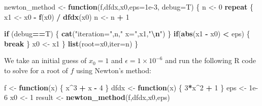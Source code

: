 \documentclass[
]{article}
\newenvironment{Shaded}{\begin{snugshade}}{\end{snugshade}}
\newcommand{\AttributeTok}[1]{\textcolor[rgb]{0.13,0.29,0.53}{#1}}
\newcommand{\ControlFlowTok}[1]{\textcolor[rgb]{0.13,0.29,0.53}{\textbf{#1}}}
\newcommand{\DecValTok}[1]{\textcolor[rgb]{0.00,0.00,0.81}{#1}}
\newcommand{\FloatTok}[1]{\textcolor[rgb]{0.00,0.00,0.81}{#1}}
\newcommand{\FunctionTok}[1]{\textcolor[rgb]{0.13,0.29,0.53}{\textbf{#1}}}
\newcommand{\NormalTok}[1]{#1}
\newcommand{\OtherTok}[1]{\textcolor[rgb]{0.56,0.35,0.01}{#1}}
\newcommand{\SpecialCharTok}[1]{\textcolor[rgb]{0.81,0.36,0.00}{\textbf{#1}}}
\newcommand{\StringTok}[1]{\textcolor[rgb]{0.31,0.60,0.02}{#1}}
\begin{document}
\begin{Shaded}
\begin{Highlighting}[]
\NormalTok{newton\_method }\OtherTok{\textless{}{-}} \ControlFlowTok{function}\NormalTok{(f,dfdx,x0,}\AttributeTok{eps=}\FloatTok{1e{-}3}\NormalTok{, }\AttributeTok{debug=}\NormalTok{T)}
\NormalTok{\{}
\NormalTok{  n }\OtherTok{\textless{}{-}} \DecValTok{0}
  \ControlFlowTok{repeat}
\NormalTok{  \{}
\NormalTok{    x1 }\OtherTok{\textless{}{-}}\NormalTok{ x0 }\SpecialCharTok{{-}} \FunctionTok{f}\NormalTok{(x0) }\SpecialCharTok{/} \FunctionTok{dfdx}\NormalTok{(x0)}
\NormalTok{    n }\OtherTok{\textless{}{-}}\NormalTok{ n }\SpecialCharTok{+} \DecValTok{1}
   
    \ControlFlowTok{if}\NormalTok{ (debug}\SpecialCharTok{==}\NormalTok{T) \{ }\FunctionTok{cat}\NormalTok{(}\StringTok{"iteration="}\NormalTok{,n,}\StringTok{" x="}\NormalTok{,x1,}\StringTok{"}\SpecialCharTok{\textbackslash{}n}\StringTok{"}\NormalTok{) \}}
    \ControlFlowTok{if}\NormalTok{(}\FunctionTok{abs}\NormalTok{(x1 }\SpecialCharTok{{-}}\NormalTok{ x0) }\SpecialCharTok{\textless{}}\NormalTok{ eps) \{ }\ControlFlowTok{break}\NormalTok{ \}}
\NormalTok{    x0 }\OtherTok{\textless{}{-}}\NormalTok{ x1}
\NormalTok{  \}}
  \FunctionTok{list}\NormalTok{(}\AttributeTok{root=}\NormalTok{x0,}\AttributeTok{iter=}\NormalTok{n)}
\NormalTok{\}}
\end{Highlighting}
\end{Shaded}

We take an initial guess of \(x_0 = 1\) and
\(\epsilon = 1 \times 10^{-6}\) and run the following R code to solve
for a root of \(f\) using Newton's method:

\begin{Shaded}
\begin{Highlighting}[]
\NormalTok{f }\OtherTok{\textless{}{-}} \ControlFlowTok{function}\NormalTok{(x) \{ x}\SpecialCharTok{\^{}}\DecValTok{3} \SpecialCharTok{+}\NormalTok{ x }\SpecialCharTok{{-}} \DecValTok{4}\NormalTok{ \}}
\NormalTok{dfdx }\OtherTok{\textless{}{-}} \ControlFlowTok{function}\NormalTok{(x) \{ }\DecValTok{3}\SpecialCharTok{*}\NormalTok{x}\SpecialCharTok{\^{}}\DecValTok{2} \SpecialCharTok{+} \DecValTok{1}\NormalTok{ \}}
\NormalTok{eps }\OtherTok{\textless{}{-}} \FloatTok{1e{-}6}
\NormalTok{x0 }\OtherTok{\textless{}{-}} \DecValTok{1}
\NormalTok{result }\OtherTok{\textless{}{-}} \FunctionTok{newton\_method}\NormalTok{(f,dfdx,x0,eps)}
\end{Highlighting}
\end{Shaded}
\end{document}

